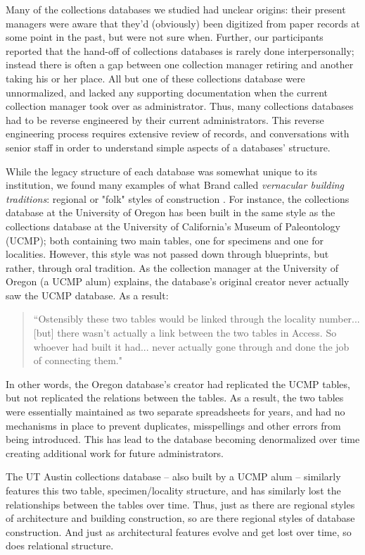 Many of the collections databases we studied had unclear origins: their present managers were aware that they'd (obviously) been digitized from paper records at some point in the past, but were not sure when. Further, our participants reported that the hand-off of collections databases is rarely done interpersonally; instead there is often a gap between one collection manager retiring and another taking his or her place. All but one of these collections database were unnormalized, and lacked any supporting documentation when the current collection manager took over as administrator. Thus, many collections databases had to be reverse engineered by their current administrators. This reverse engineering process requires extensive review of records, and conversations with senior staff  in order to understand simple aspects of a databases’ structure. 

While the legacy structure of each database was somewhat unique to its institution, we found many examples of what Brand called \textit{vernacular building traditions}: regional or "folk" styles of construction \cite{brand1995buildings}. For instance, the collections database at the University of Oregon has been built in the same style as the collections database at the University of California’s Museum of Paleontology (UCMP); both containing two main tables, one for specimens and one for localities. However, this style was not passed down through blueprints, but rather, through oral tradition. As the collection manager at the University of Oregon (a UCMP alum) explains, the database’s original creator never actually saw the UCMP database. As a result:
\begin{quote}
“Ostensibly these two tables would be linked through the locality number... [but] there wasn't actually a link between the two tables in Access. So whoever had built it had... never actually gone through and done the job of connecting them."
\end{quote}
In other words, the Oregon database's creator had replicated the UCMP tables, but not replicated the relations between the tables. As a result, the two tables were essentially maintained as two separate spreadsheets for years, and had no mechanisms in place to prevent duplicates, misspellings and other errors from being introduced. This has lead to the database becoming denormalized over time creating additional work for future administrators.  

The UT Austin collections database – also built by a UCMP alum – similarly features this two table, specimen/locality structure, and has similarly lost the relationships between the tables over time. Thus, just as there are regional styles of architecture and building construction, so are there regional styles of database construction. And just as architectural features evolve and get lost over time, so does relational structure.

